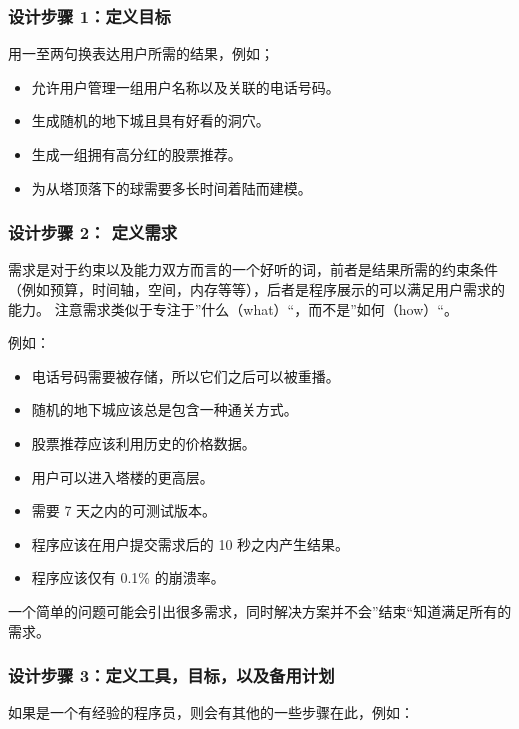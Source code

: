 \documentclass[../../LearnCpp.tex]{subfiles}
\begin{document}

\subsubsection*{设计步骤 1：定义目标}

用一至两句换表达用户所需的结果，例如；

\begin{itemize}
    \item 允许用户管理一组用户名称以及关联的电话号码。
    \item 生成随机的地下城且具有好看的洞穴。
    \item 生成一组拥有高分红的股票推荐。
    \item 为从塔顶落下的球需要多长时间着陆而建模。
\end{itemize}

\subsubsection*{设计步骤 2： 定义需求}

需求是对于约束以及能力双方而言的一个好听的词，前者是结果所需的约束条件（例如预算，时间轴，空间，内存等等），后者是程序展示的可以满足用户需求的能力。
注意需求类似于专注于”什么（what）“，而不是”如何（how）“。

例如：

\begin{itemize}
    \item 电话号码需要被存储，所以它们之后可以被重播。
    \item 随机的地下城应该总是包含一种通关方式。
    \item 股票推荐应该利用历史的价格数据。
    \item 用户可以进入塔楼的更高层。
    \item 需要 7 天之内的可测试版本。
    \item 程序应该在用户提交需求后的 10 秒之内产生结果。
    \item 程序应该仅有 0.1\% 的崩溃率。
\end{itemize}

一个简单的问题可能会引出很多需求，同时解决方案并不会”结束“知道满足所有的需求。

\subsubsection*{设计步骤 3：定义工具，目标，以及备用计划}

如果是一个有经验的程序员，则会有其他的一些步骤在此，例如：
\end{document}
